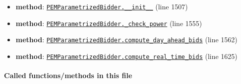 \documentclass[11pt]{report}
\begin{document}
\begin{itemize}[leftmargin=*]
  \item \textbf{method}: \hyperref[def:bidder.py:PEMParametrizedBidder.__init__:L1507]{\texttt{PEMParametrizedBidder.\_\_init\_\_}} (line 1507)
  \item \textbf{method}: \hyperref[def:bidder.py:PEMParametrizedBidder._check_power:L1555]{\texttt{PEMParametrizedBidder.\_check\_power}} (line 1555)
  \item \textbf{method}: \hyperref[def:bidder.py:PEMParametrizedBidder.compute_day_ahead_bids:L1562]{\texttt{PEMParametrizedBidder.compute\_day\_ahead\_bids}} (line 1562)
  \item \textbf{method}: \hyperref[def:bidder.py:PEMParametrizedBidder.compute_real_time_bids:L1625]{\texttt{PEMParametrizedBidder.compute\_real\_time\_bids}} (line 1625)
\end{itemize}
\paragraph{Called functions/methods in this file}
\end{document}
